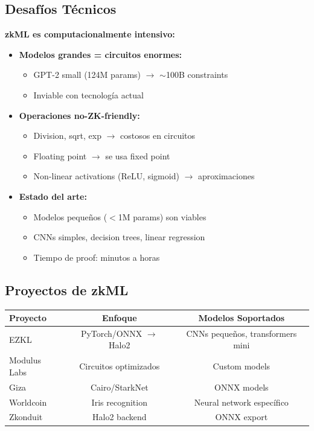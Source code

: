 \documentclass[11pt,a4paper,twoside]{book}
\begin{document}
\subsection{Desaf\'ios T\'ecnicos}

\begin{remark}
\textbf{zkML es computacionalmente intensivo:}

\begin{itemize}
    \item \textbf{Modelos grandes = circuitos enormes:}
    \begin{itemize}
        \item GPT-2 small (124M params) $\to$ $\sim$100B constraints
        \item Inviable con tecnolog\'ia actual
    \end{itemize}
    
    \item \textbf{Operaciones no-ZK-friendly:}
    \begin{itemize}
        \item Division, sqrt, exp $\to$ costosos en circuitos
        \item Floating point $\to$ se usa fixed point
        \item Non-linear activations (ReLU, sigmoid) $\to$ aproximaciones
    \end{itemize}
    
    \item \textbf{Estado del arte:}
    \begin{itemize}
        \item Modelos peque\~nos ($<$1M params) son viables
        \item CNNs simples, decision trees, linear regression
        \item Tiempo de proof: minutos a horas
    \end{itemize}
\end{itemize}
\end{remark}

\subsection{Proyectos de zkML}

\begin{center}
\begin{tabular}{lcc}
\toprule
\textbf{Proyecto} & \textbf{Enfoque} & \textbf{Modelos Soportados} \\
\midrule
EZKL & PyTorch/ONNX $\to$ Halo2 & CNNs peque\~nos, transformers mini \\
Modulus Labs & Circuitos optimizados & Custom models \\
Giza & Cairo/StarkNet & ONNX models \\
Worldcoin & Iris recognition & Neural network espec\'ifico \\
Zkonduit & Halo2 backend & ONNX export \\
\bottomrule
\end{tabular}
\end{center}
\end{document}
